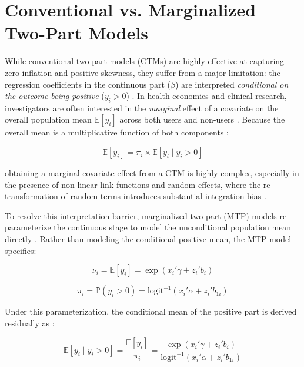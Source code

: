 \documentclass[11pt, a4paper]{article}
\begin{document}
\section{Conventional vs. Marginalized Two-Part Models}

While conventional two-part models (CTMs) are highly effective at capturing zero-inflation and positive skewness, they suffer from a major limitation: the regression coefficients in the continuous part ($\beta$) are interpreted \textit{conditional on the outcome being positive} ($y_i > 0$) \cite{ref3, ref16}. In health economics and clinical research, investigators are often interested in the \textit{marginal} effect of a covariate on the overall population mean $\mathbb{E}[y_i]$ across both users and non-users \cite{ref3, ref16, ref46}. Because the overall mean is a multiplicative function of both components \cite{ref5, ref35}:

\begin{equation}
\mathbb{E}[y_i] = \pi_i \times \mathbb{E}[y_i \mid y_i > 0]
\end{equation}

obtaining a marginal covariate effect from a CTM is highly complex, especially in the presence of non-linear link functions and random effects, where the re-transformation of random terms introduces substantial integration bias \cite{ref3, ref6, ref46}.

To resolve this interpretation barrier, marginalized two-part (MTP) models re-parameterize the continuous stage to model the unconditional population mean directly \cite{ref3, ref16, ref46}. Rather than modeling the conditional positive mean, the MTP model specifies:

\begin{equation}
\nu_i = \mathbb{E}[y_i] = \exp(x_{i}' \gamma + z_{i}' b_{i})
\end{equation}

\begin{equation}
\pi_i = \mathbb{P}(y_i > 0) = \text{logit}^{-1}(x_i' \alpha + z_i' b_{1i})
\end{equation}

Under this parameterization, the conditional mean of the positive part is derived residually as \cite{ref3}:

\begin{equation}
\mathbb{E}[y_i \mid y_i > 0] = \frac{\mathbb{E}[y_i]}{\pi_i} = \frac{\exp(x_{i}' \gamma + z_{i}' b_{i})}{\text{logit}^{-1}(x_i' \alpha + z_i' b_{1i})}
\end{equation}
\end{document}
